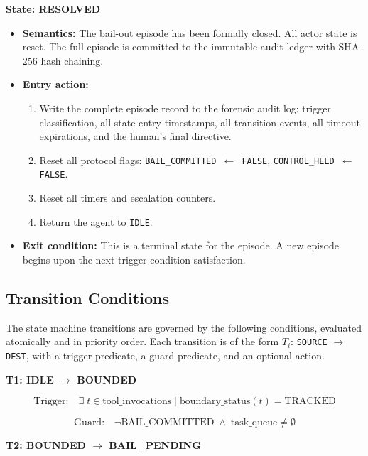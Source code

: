 \bigskip

\noindent\textbf{State: RESOLVED}

\begin{itemize}
  \item \textbf{Semantics:} The bail-out episode has been formally closed. All actor state is reset. The full episode is committed to the immutable audit ledger with SHA-256 hash chaining.
  \item \textbf{Entry action:}
    \begin{enumerate}
      \item Write the complete episode record to the forensic audit log: trigger classification, all state entry timestamps, all transition events, all timeout expirations, and the human's final directive.
      \item Reset all protocol flags: \texttt{BAIL\_COMMITTED $\gets$ FALSE}, \texttt{CONTROL\_HELD $\gets$ FALSE}.
      \item Reset all timers and escalation counters.
      \item Return the agent to \texttt{IDLE}.
    \end{enumerate}
  \item \textbf{Exit condition:} This is a terminal state for the episode. A new episode begins upon the next trigger condition satisfaction.
\end{itemize}

\bigskip

\subsection{Transition Conditions}

The state machine transitions are governed by the following conditions, evaluated atomically and in priority order. Each transition is of the form $T_i$: \texttt{SOURCE} $\rightarrow$ \texttt{DEST}, with a trigger predicate, a guard predicate, and an optional action.

\bigskip

\noindent\textbf{T1: IDLE $\rightarrow$ BOUNDED}

\[
\text{Trigger:} \quad \exists \; t \in \text{tool\_invocations} \;|\; \text{boundary\_status}(t) = \text{TRACKED}
\]

\[
\text{Guard:} \quad \neg\text{BAIL\_COMMITTED} \;\land\; \text{task\_queue} \neq \emptyset
\]

\bigskip

\noindent\textbf{T2: BOUNDED $\rightarrow$ BAIL\_PENDING}

